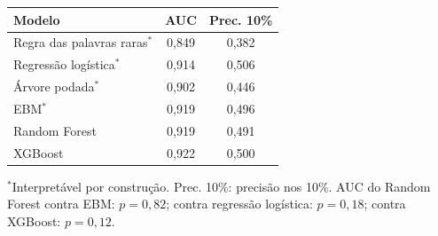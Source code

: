 \begin{tabular}{@{}lcc@{}}
\toprule
Modelo & AUC & Prec. 10\% \\
\midrule
Regra das palavras raras$^{\ast}$ & 0,849 & 0,382 \\
Regressão logística$^{\ast}$ & 0,914 & 0,506 \\
Árvore podada$^{\ast}$ & 0,902 & 0,446 \\
EBM$^{\ast}$ & 0,919 & 0,496 \\
Random Forest & 0,919 & 0,491 \\
XGBoost & 0,922 & 0,500 \\
\bottomrule
\end{tabular}

\vspace{2pt}
{\footnotesize $^{\ast}$Interpretável por construção. Prec. 10\%: precisão nos
10\%. AUC do Random Forest contra EBM: $p = 0,82$;
contra regressão logística: $p = 0,18$;
contra XGBoost: $p = 0,12$.\par}
